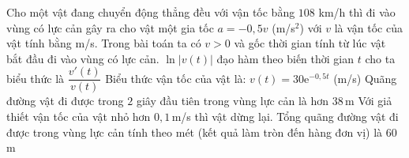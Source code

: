 \begin{ex}
    Cho một vật đang chuyển động thẳng đều với vận tốc bằng $108$ km/h thì đi vào vùng có lực cản gây ra cho vật một gia tốc $a = -0{,}5v$ (m/s$^2$) với $v$ là vận tốc của vật tính bằng m/s. Trong bài toán ta có $v > 0$ và gốc thời gian tính từ lúc vật bắt đầu đi vào vùng có lực cản.
    \choiceTF
    {\True $\ln|v(t)|$ đạo hàm theo biến thời gian $t$ cho ta biểu thức là $\dfrac{v'(t)}{v(t)}$}
    { Biểu thức vận tốc của vật là: $v(t) = 30 \mathrm{e}^{-0{,}5t}$ (m/s)}
    {Quãng đường vật đi được trong $2$ giây đầu tiên trong vùng lực cản là hơn $38$\,m}
    {\True Với giả thiết vận tốc của vật nhỏ hơn $0{,}1$\,m/s thì vật dừng lại. Tổng quãng đường vật đi được trong vùng lực cản tính theo mét (kết quả làm tròn đến hàng đơn vị) là $60$ m}
\end{ex}

